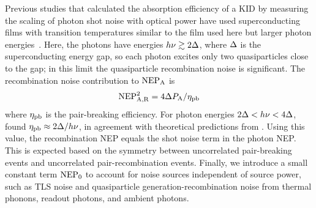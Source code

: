 Previous studies that calculated the absorption efficiency of a KID by measuring the scaling of photon shot noise with optical power have used superconducting films with transition temperatures similar to the film used here but larger photon energies~\autocite{Yates2011APL,Janssen2013APL,deVisser2014NatComm,Hubmayr2015APL}.
Here, the photons have energies $h \nu \gtrsim 2 \Delta$, where $\Delta$ is the superconducting energy gap, so each photon excites only two quasiparticles close to the gap; in this limit the quasiparticle recombination noise is significant.
The recombination noise contribution to $\mathrm{NEP}_{\mathrm{A}}$ is
\begin{equation}
\label{eqn:recombination_nep}
\mathrm{NEP}_{\mathrm{A}, \mathrm{R}}^2
  =
  4 \Delta P_{\mathrm{A}} / \eta_\mathrm{pb}
\end{equation}
where $\eta_\mathrm{pb}$ is the pair-breaking efficiency.
For photon energies $2 \Delta < h \nu < 4 \Delta$, \textcite{deVisser2015APL} found $\eta_\mathrm{pb} \approx 2 \Delta / h \nu$, in agreement with theoretical predictions from \textcite{Guruswamy2014SUST}.
Using this value, the recombination NEP equals the shot noise term in the photon NEP.
This is expected based on the symmetry between uncorrelated pair-breaking events and uncorrelated pair-recombination events.
Finally, we introduce a small constant term $\mathrm{NEP}_0$ to account for noise sources independent of source power, such as TLS noise and quasiparticle generation-recombination noise from thermal phonons, readout photons, and ambient photons.

